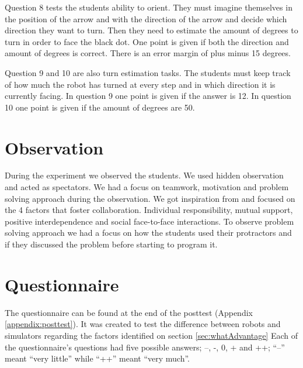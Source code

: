 \bigskip\noindent
Question 8 tests the students ability to orient. They must imagine themselves in the position of the arrow and with the direction of the arrow and decide which direction they want to turn. Then they need to estimate the amount of degrees to turn in order to face the black dot. One point is given if both the direction and amount of degrees is correct. There is an error margin of plus minus 15 degrees. 

\bigskip\noindent
Question 9 and 10 are also turn estimation tasks. The students must keep track of how much the robot has turned at every step and in which direction it is currently facing. In question 9 one point is given if the answer is 12. In question 10 one point is given if the amount of degrees are 50. 

\section{Observation}
During the experiment we observed the students. We used hidden observation and acted as spectators. We had a focus on teamwork, motivation and problem solving approach during the observation. We got inspiration from  and focused on the 4 factors that foster collaboration. Individual responsibility, mutual support, positive interdependence and social face-to-face interactions. To observe problem solving approach we had a focus on how the students used their protractors and if they discussed the problem before starting to program it.

\section{Questionnaire}
The questionnaire can be found at the end of the posttest (Appendix \ref{appendix:posttest}). It was created to test the difference between robots and simulators regarding the factors identified on section \ref{sec:whatAdvantage} Each of the questionnaire's questions had five possible answers; --, -, 0, + and ++; ``--'' meant ``very little'' while ``++'' meant ``very much''.
